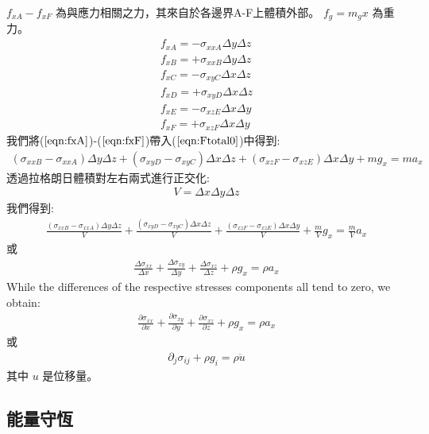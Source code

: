 $f_{xA}- f_{xF}$ 為與應力相關之力，其來自於各邊界A-F上體積外部。 
$f_g=m_gx$ 為重力。
\begin{align}
f_{xA} = -\sigma_{xxA}\Delta y\Delta z\\\label{eqn:fxA}
f_{xB} = +\sigma_{xxB}\Delta y\Delta z\\\label{eqn:fxB}
f_{xC} = -\sigma_{xyC}\Delta x\Delta z\\\label{eqn:fxC}
f_{xD} = +\sigma_{xyD}\Delta x\Delta z\\\label{eqn:fxD}
f_{xE} = -\sigma_{xzE}\Delta x\Delta y\\\label{eqn:fxE}
f_{xF} = +\sigma_{xzF}\Delta x\Delta y\label{eqn:fxF}
\end{align}
我們將($\ref{eqn:fxA}$)-($\ref{eqn:fxF}$)帶入($\ref{eqn:Ftotal0}$)中得到:
\begin{align}
(\sigma_{xxB}-\sigma_{xxA})\Delta y\Delta z+(\sigma_{xyD}-\sigma_{xyC})\Delta x\Delta z+(\sigma_{xzF}-\sigma_{xzE})\Delta x\Delta y+mg_x = ma_x 
\end{align}
透過拉格朗日體積對左右兩式進行正交化:
\begin{align}
V=\Delta x\Delta y\Delta z
\end{align}
我們得到:
\begin{align}
\frac{(\sigma_{xxB}-\sigma_{xxA})\Delta y\Delta z}{V}+\frac{(\sigma_{xyD}-\sigma_{xyC})\Delta x\Delta z}{V}+\frac{(\sigma_{xzF}-\sigma_{xzE})\Delta x\Delta y}{V}+\frac{m}{V}g_x=\frac{m}{V}a_x
\end{align}
或
\begin{align}
\frac{\Delta\sigma_{xx}}{\Delta x}+\frac{\Delta\sigma_{xy}}{\Delta y}+\frac{\Delta\sigma_{xz}}{\Delta z}+\rho g_x = \rho a_x
\end{align}
While the differences of the respective stresses components all tend to zero, we obtain:
\begin{align}
\frac{\partial\sigma_{xx}}{\partial x}+\frac{\partial\sigma_{xy}}{\partial y}+\frac{\partial\sigma_{xz}}{\partial z}+\rho g_x = \rho a_x
\end{align}
或
\begin{align}
\partial_j\sigma_{ij}+\rho g_i = \rho \ddot u
\end{align}
其中 $u$ 是位移量。
\subsection{能量守恆}

